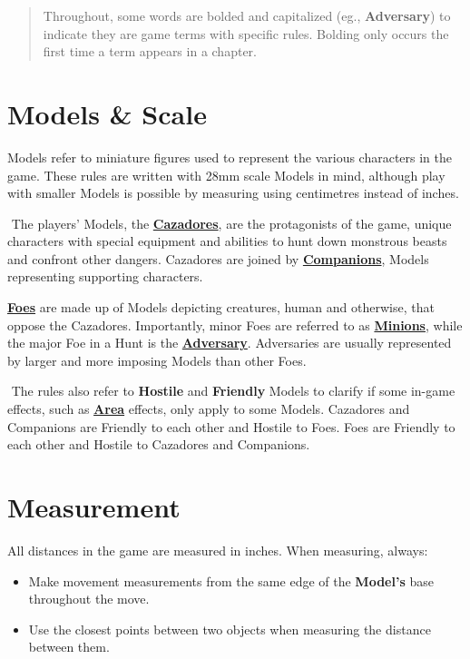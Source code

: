 \documentclass[
]{book}
\providecommand{\tightlist}{%
  \setlength{\itemsep}{0pt}\setlength{\parskip}{0pt}}
\begin{document}
\begin{quote}
Throughout, some words are bolded and capitalized (eg., \textbf{Adversary}) to indicate they are game terms with specific rules. Bolding only occurs the first time a term appears in a chapter.
\end{quote}

\hypertarget{scale}{%
\section{Models \& Scale}\label{scale}}

Models refer to miniature figures used to represent the various characters in the game. These rules are written with 28mm scale Models in mind, although play with smaller Models is possible by measuring using centimetres instead of inches.

 The players' Models, the \textbf{\protect\hyperlink{cazadores}{Cazadores}}, are the protagonists of the game, unique characters with special equipment and abilities to hunt down monstrous beasts and confront other dangers. Cazadores are joined by \textbf{\protect\hyperlink{cazadores}{Companions}}, Models representing supporting characters.

\textbf{\protect\hyperlink{foes}{Foes}} are made up of Models depicting creatures, human and otherwise, that oppose the Cazadores. Importantly, minor Foes are referred to as \textbf{\protect\hyperlink{ftypes}{Minions}}, while the major Foe in a Hunt is the \textbf{\protect\hyperlink{adeck}{Adversary}}. Adversaries are usually represented by larger and more imposing Models than other Foes.

 The rules also refer to \textbf{Hostile} and \textbf{Friendly} Models to clarify if some in-game effects, such as \textbf{\protect\hyperlink{areas}{Area}} effects, only apply to some Models. Cazadores and Companions are Friendly to each other and Hostile to Foes. Foes are Friendly to each other and Hostile to Cazadores and Companions.

\hypertarget{measurement}{%
\section{Measurement}\label{measurement}}

All distances in the game are measured in inches. When measuring, always:

\begin{itemize}
\tightlist
\item
  Make movement measurements from the same edge of the \textbf{Model's} base throughout the move.
\item
  Use the closest points between two objects when measuring the distance between them.
\end{itemize}
\end{document}
